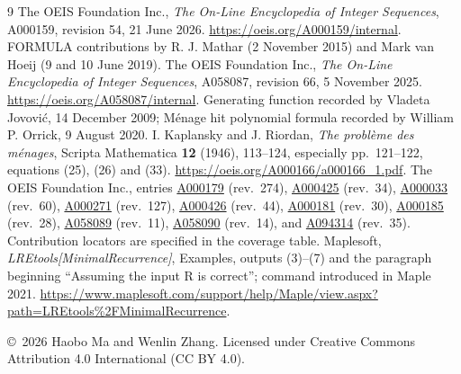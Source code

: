 \documentclass[11pt]{article}
\begin{document}
\begin{thebibliography}{9}
The OEIS Foundation Inc., \emph{The On-Line Encyclopedia of Integer
Sequences}, A000159, revision 54, 21 June 2026.
\url{https://oeis.org/A000159/internal}.
FORMULA contributions by R. J. Mathar (2 November 2015) and Mark
van Hoeij (9 and 10 June 2019).
The OEIS Foundation Inc., \emph{The On-Line Encyclopedia of Integer
Sequences}, A058087, revision 66, 5 November 2025.
\url{https://oeis.org/A058087/internal}.
Generating function recorded by Vladeta Jovovi\'c, 14 December 2009;
M\'enage hit polynomial formula recorded by William P. Orrick,
9 August 2020.
I. Kaplansky and J. Riordan,
\emph{The probl\`eme des m\'enages},
Scripta Mathematica \textbf{12} (1946), 113--124,
especially pp.~121--122, equations (25), (26) and (33).
\url{https://oeis.org/A000166/a000166_1.pdf}.
The OEIS Foundation Inc., entries
\href{https://oeis.org/A000179/internal}{A000179} (rev.~274),
\href{https://oeis.org/A000425/internal}{A000425} (rev.~34),
\href{https://oeis.org/A000033/internal}{A000033} (rev.~60),
\href{https://oeis.org/A000271/internal}{A000271} (rev.~127),
\href{https://oeis.org/A000426/internal}{A000426} (rev.~44),
\href{https://oeis.org/A000181/internal}{A000181} (rev.~30),
\href{https://oeis.org/A000185/internal}{A000185} (rev.~28),
\href{https://oeis.org/A058089/internal}{A058089} (rev.~11),
\href{https://oeis.org/A058090/internal}{A058090} (rev.~14), and
\href{https://oeis.org/A094314/internal}{A094314} (rev.~35).
Contribution locators are specified in the coverage table.
Maplesoft, \emph{LREtools[MinimalRecurrence]}, Examples, outputs (3)--(7)
and the paragraph beginning ``Assuming the input R is correct'';
command introduced in Maple 2021.
\url{https://www.maplesoft.com/support/help/Maple/view.aspx?path=LREtools%2FMinimalRecurrence}.
\end{thebibliography}
\bigskip
\noindent\footnotesize
\copyright\ 2026 Haobo Ma and Wenlin Zhang.
Licensed under Creative Commons Attribution 4.0 International
(CC BY 4.0).
\end{document}
